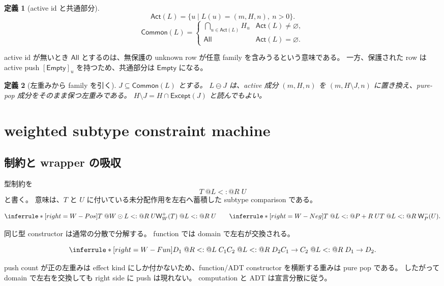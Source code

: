 \documentclass[uplatex,dvipdfmx,a4paper,10.5pt]{jsarticle}
\makeatletter
\theoremstyle{jpplain}
\newtheorem{definition}{定義}[section]
\newcommand{\All}{\mathsf{All}}
\newcommand{\Empty}{\mathsf{Empty}}
\newcommand{\Common}{\mathsf{Common}}
\newcommand{\PWeight}[2]{\mathsf{W}^{+}_{#1}(#2)}
\newcommand{\NWeight}[2]{\mathsf{W}^{-}_{#1}(#2)}
\newcommand{\takeop}[2]{[#1]_{#2}}
\newcommand{\wsub}[4]{#1\;@#2\mathrel{<:}@#3\;#4}
\makeatother
\begin{document}
\begin{definition}[active id と共通部分]
\[
  \mathsf{Act}(L)=\{u\mid L(u)=(m,H,n),\ n>0\}.
\]
\[
  \Common(L)=
  \begin{cases}
    \displaystyle\bigcap_{u\in\mathsf{Act}(L)} H_u & \mathsf{Act}(L)\neq\varnothing,\\
    \All & \mathsf{Act}(L)=\varnothing.
  \end{cases}
\]
\end{definition}

active id が無いとき $\All$ とするのは、無保護の unknown row が任意 family を含みうるという意味である。
一方、保護された row は active push $\takeop{\Empty}{u}$ を持つため、共通部分は $\Empty$ になる。

\begin{definition}[左重みから family を引く]
$J\subseteq\Common(L)$ とする。
$L\ominus J$ は、active 成分
$(m,H,n)$ を $(m,H\setminus J,n)$ に置き換え、pure-pop 成分をそのまま保つ左重みである。
$H\setminus J=H\cap\mathsf{Except}(J)$ と読んでもよい。
\end{definition}

\section{weighted subtype constraint machine}

\subsection{制約と wrapper の吸収}

型制約を
\[
  \wsub{T}{L}{R}{U}
\]
と書く。
意味は、$T$ と $U$ に付いている未分配作用を左右へ蓄積した subtype comparison である。

\[
\inferrule*[right=W-Pos]
 {\wsub{T}{W\odot L}{R}{U}}
 {\wsub{\PWeight{W}{T}}{L}{R}{U}}
\qquad
\inferrule*[right=W-Neg]
 {\wsub{T}{L}{P+R}{U}}
 {\wsub{T}{L}{R}{\NWeight{P}{U}}}.
\]

同じ型 constructor は通常の分散で分解する。
function では domain で左右が交換される。

\[
\inferrule*[right=W-Fun]
 {\wsub{D_1}{R}{L}{C_1}\\
  \wsub{C_2}{L}{R}{D_2}}
 {\wsub{C_1\to C_2}{L}{R}{D_1\to D_2}}.
\]

push count が正の左重みは effect kind にしか付かないため、function/ADT constructor を横断する重みは pure pop である。
したがって domain で左右を交換しても right side に push は現れない。
computation と ADT は宣言分散に従う。
\end{document}

